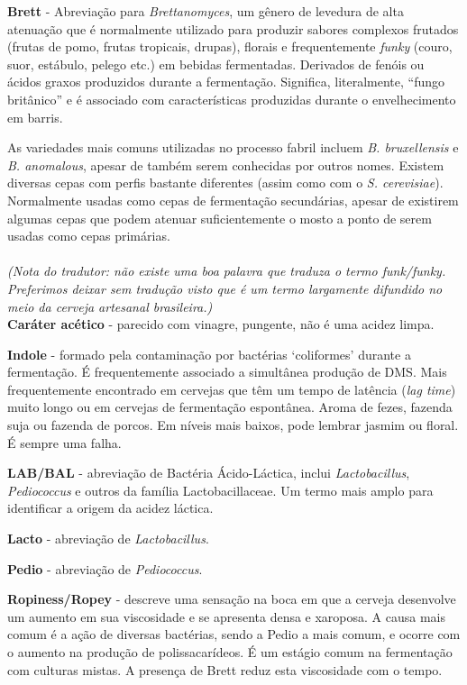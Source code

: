 \textbf{Brett} - Abreviação para \textit{Brettanomyces}, um gênero de levedura de alta atenuação que é normalmente utilizado para produzir sabores complexos frutados (frutas de pomo, frutas tropicais, drupas), florais e frequentemente \textit{funky} (couro, suor, estábulo, pelego etc.) em bebidas fermentadas. Derivados de fenóis ou ácidos graxos produzidos durante a fermentação. Significa, literalmente, “fungo britânico” e é associado com características produzidas durante o envelhecimento em barris.

As variedades mais comuns utilizadas no processo fabril incluem \textit{B. bruxellensis} e \textit{B. anomalous}, apesar de também serem conhecidas por outros nomes. Existem diversas cepas com perfis bastante diferentes (assim como com o \textit{S. cerevisiae}). Normalmente usadas como cepas de fermentação secundárias, apesar de existirem algumas cepas que podem atenuar suficientemente o mosto a ponto de serem usadas como cepas primárias.\\\\
\textit{(Nota do tradutor: não existe uma boa palavra que traduza o termo funk/funky. Preferimos deixar sem tradução visto que é um termo largamente difundido no meio da cerveja artesanal brasileira.)}\\

\textbf{Caráter acético} - parecido com vinagre, pungente, não é uma acidez limpa.

\textbf{Indole} - formado pela contaminação por bactérias ‘coliformes’ durante a fermentação. É frequentemente associado a simultânea produção de DMS. Mais frequentemente encontrado em cervejas que têm um tempo de latência (\textit{lag time}) muito longo ou em cervejas de fermentação espontânea. Aroma de fezes, fazenda suja ou fazenda de porcos. Em níveis mais baixos, pode lembrar jasmim ou floral. É sempre uma falha.

\textbf{LAB/BAL} - abreviação de Bactéria Ácido-Láctica, inclui \textit{Lactobacillus}, \textit{Pediococcus} e outros da família Lactobacillaceae. Um termo mais amplo para identificar a origem da acidez láctica.

\textbf{Lacto} - abreviação de \textit{Lactobacillus}.

\textbf{Pedio} - abreviação de \textit{Pediococcus}.

\textbf{Ropiness/Ropey} - descreve uma sensação na boca em que a cerveja desenvolve um aumento em sua viscosidade e se apresenta densa e xaroposa. A causa mais comum é a ação de diversas bactérias, sendo a Pedio a mais comum, e ocorre com o aumento na produção de polissacarídeos. É um estágio comum na fermentação com culturas mistas. A presença de Brett reduz esta viscosidade com o tempo.

